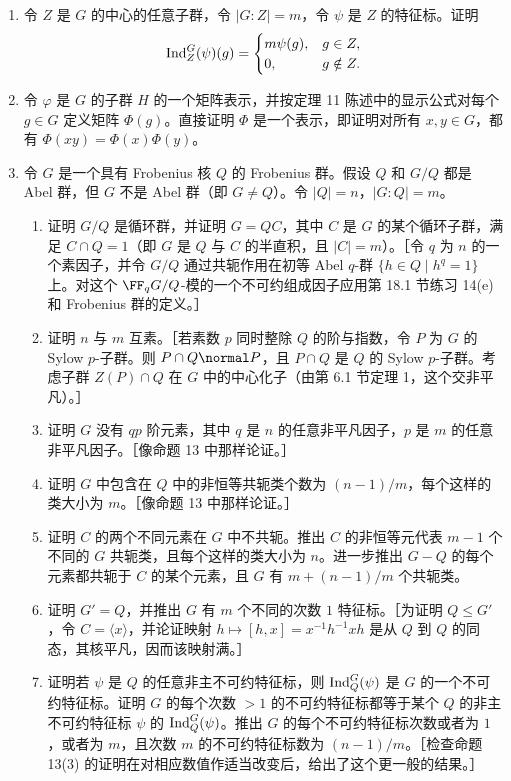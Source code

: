\begin{enumerate}[label=\arabic*.]
  \item 令 $Z$ 是 $G$ 的中心的任意子群，令 $|G:Z|=m$，令 $\psi$ 是 $Z$ 的特征标。证明
  \[
    \operatorname{Ind}_Z^G(\psi)(g)=
    \begin{cases}
      m\psi(g),& g\in Z,\\
      0,& g\notin Z.
    \end{cases}
  \]
  \item 令 $\varphi$ 是 $G$ 的子群 $H$ 的一个矩阵表示，并按定理 11 陈述中的显示公式对每个 $g\in G$ 定义矩阵 $\Phi(g)$。直接证明 $\Phi$ 是一个表示，即证明对所有 $x,y\in G$，都有 $\Phi(xy)=\Phi(x)\Phi(y)$。
  \item 令 $G$ 是一个具有 Frobenius 核 $Q$ 的 Frobenius 群。假设 $Q$ 和 $G/Q$ 都是 Abel 群，但 $G$ 不是 Abel 群（即 $G\neq Q$）。令 $|Q|=n$，$|G:Q|=m$。
  \begin{enumerate}[label=(\alph*)]
    \item 证明 $G/Q$ 是循环群，并证明 $G=QC$，其中 $C$ 是 $G$ 的某个循环子群，满足 $C\cap Q=1$（即 $G$ 是 $Q$ 与 $C$ 的半直积，且 $|C|=m$）。［令 $q$ 为 $n$ 的一个素因子，并令 $G/Q$ 通过共轭作用在初等 Abel $q$-群 $\{h\in Q\mid h^q=1\}$ 上。对这个 $\FF_qG/Q$-模的一个不可约组成因子应用第 18.1 节练习 14(e) 和 Frobenius 群的定义。］
    \item 证明 $n$ 与 $m$ 互素。［若素数 $p$ 同时整除 $Q$ 的阶与指数，令 $P$ 为 $G$ 的 Sylow $p$-子群。则 $P\cap Q\normal P$，且 $P\cap Q$ 是 $Q$ 的 Sylow $p$-子群。考虑子群 $Z(P)\cap Q$ 在 $G$ 中的中心化子（由第 6.1 节定理 1，这个交非平凡）。］
    \item 证明 $G$ 没有 $qp$ 阶元素，其中 $q$ 是 $n$ 的任意非平凡因子，$p$ 是 $m$ 的任意非平凡因子。［像命题 13 中那样论证。］
    \item 证明 $G$ 中包含在 $Q$ 中的非恒等共轭类个数为 $(n-1)/m$，每个这样的类大小为 $m$。［像命题 13 中那样论证。］
    \item 证明 $C$ 的两个不同元素在 $G$ 中不共轭。推出 $C$ 的非恒等元代表 $m-1$ 个不同的 $G$ 共轭类，且每个这样的类大小为 $n$。进一步推出 $G-Q$ 的每个元素都共轭于 $C$ 的某个元素，且 $G$ 有 $m+(n-1)/m$ 个共轭类。
    \item 证明 $G'=Q$，并推出 $G$ 有 $m$ 个不同的次数 $1$ 特征标。［为证明 $Q\leq G'$，令 $C=\langle x\rangle$，并论证映射 $h\mapsto[h,x]=x^{-1}h^{-1}xh$ 是从 $Q$ 到 $Q$ 的同态，其核平凡，因而该映射满。］
    \item 证明若 $\psi$ 是 $Q$ 的任意非主不可约特征标，则 $\operatorname{Ind}_Q^G(\psi)$ 是 $G$ 的一个不可约特征标。证明 $G$ 的每个次数 $>1$ 的不可约特征标都等于某个 $Q$ 的非主不可约特征标 $\psi$ 的 $\operatorname{Ind}_Q^G(\psi)$。推出 $G$ 的每个不可约特征标次数或者为 $1$，或者为 $m$，且次数 $m$ 的不可约特征标数为 $(n-1)/m$。［检查命题 13(3) 的证明在对相应数值作适当改变后，给出了这个更一般的结果。］

\end{enumerate}
\end{enumerate}

